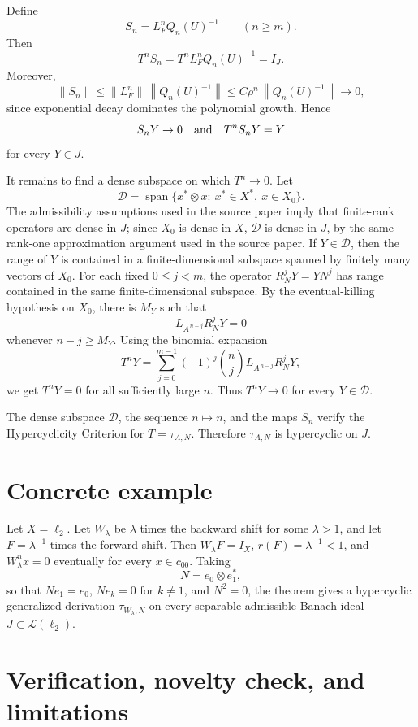 \documentclass[11pt]{article}
\newcommand{\LL}{\mathcal L}
\newcommand{\J}{J}
\newcommand{\norm}[1]{\left\lVert #1 \right\rVert}
\begin{document}
Define
\[
  S_n=L_F^n Q_n(U)^{-1}\qquad(n\geq m).
\]
Then
\[
  T^n S_n = T^n L_F^n Q_n(U)^{-1}=I_\J.
\]
Moreover,
\[
  \norm{S_n}\leq \norm{L_F^n}\,\norm{Q_n(U)^{-1}}
       \leq C\rho^n\,\norm{Q_n(U)^{-1}}\longrightarrow 0,
\]
since exponential decay dominates the polynomial growth.  Hence
\[
  S_n Y\to 0
  \quad\hbox{and}\quad
  T^n S_n Y=Y
\]
for every \(Y\in \J\).

It remains to find a dense subspace on which \(T^n\to 0\).  Let
\[
  \mathcal D=\operatorname{span}\{x^*\otimes x:\ x^*\in X^*,\ x\in X_0\}.
\]
The admissibility assumptions used in the source paper imply that finite-rank
operators are dense in \(\J\); since \(X_0\) is dense in \(X\), \(\mathcal D\)
is dense in \(\J\), by the same rank-one approximation argument used in the
source paper.  If \(Y\in \mathcal D\), then the range of \(Y\) is contained in
a finite-dimensional subspace spanned by finitely many vectors of \(X_0\).
For each fixed \(0\leq j<m\), the operator \(R_N^jY=YN^j\) has range contained
in the same finite-dimensional subspace.  By the eventual-killing hypothesis on
\(X_0\), there is \(M_Y\) such that
\[
  L_{A^{\,n-j}}R_N^jY=0
\]
whenever \(n-j\geq M_Y\).  Using the binomial expansion
\[
  T^nY=\sum_{j=0}^{m-1}(-1)^j \binom{n}{j}
        L_{A^{\,n-j}}R_N^jY,
\]
we get \(T^nY=0\) for all sufficiently large \(n\).  Thus \(T^nY\to 0\) for
every \(Y\in \mathcal D\).

The dense subspace \(\mathcal D\), the sequence \(n\mapsto n\), and the maps
\(S_n\) verify the Hypercyclicity Criterion for \(T=\tau_{A,N}\).  Therefore
\(\tau_{A,N}\) is hypercyclic on \(\J\).

\section*{Concrete example}

Let \(X=\ell_2\).  Let \(W_\lambda\) be \(\lambda\) times the backward shift
for some \(\lambda>1\), and let \(F=\lambda^{-1}\) times the forward shift.
Then \(W_\lambda F=I_X\), \(r(F)=\lambda^{-1}<1\), and \(W_\lambda^n x=0\)
eventually for every \(x\in c_{00}\).  Taking
\[
  N=e_0\otimes e_1^*,
\]
so that \(Ne_1=e_0\), \(Ne_k=0\) for \(k\neq 1\), and \(N^2=0\), the theorem
gives a hypercyclic generalized derivation \(\tau_{W_\lambda,N}\) on every
separable admissible Banach ideal \(\J\subset\LL(\ell_2)\).

\section*{Verification, novelty check, and limitations}
\end{document}

